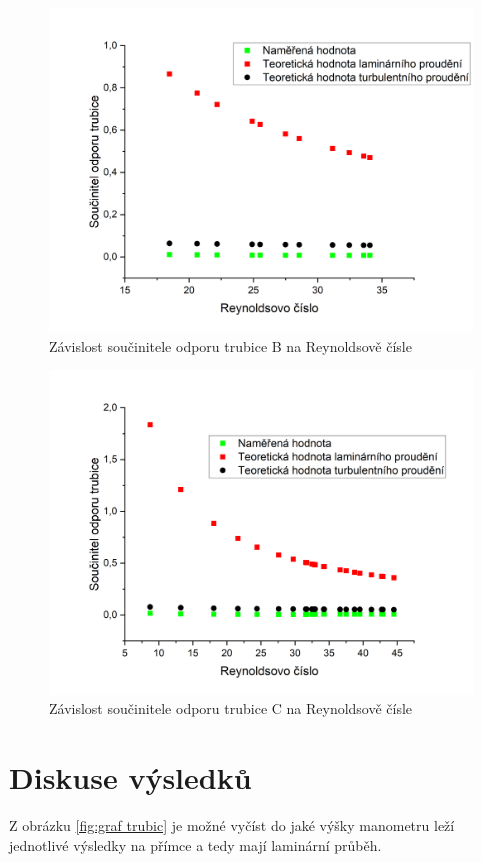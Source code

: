     \begin{figure}[h]
        \centering
        \includegraphics[width=0.6\linewidth]{01 - Studium proudění viskózní kapaliny trubicemi kruhového průřezu//Protokol//img/Re(k) B.png}
        \caption{Závislost součinitele odporu trubice B na Reynoldsově čísle}
        \label{fig:Re(k)) B}
    \end{figure}

    \begin{figure}[h]
        \centering
        \includegraphics[width=0.6\linewidth]{01 - Studium proudění viskózní kapaliny trubicemi kruhového průřezu//Protokol//img/Re(k) C.png}
        \caption{Závislost součinitele odporu trubice C na Reynoldsově čísle}
        \label{fig:Re(k) C}
    \end{figure}
\newpage
    
\section{Diskuse výsledků}

    Z obrázku \ref{fig:graf trubic} je možné vyčíst do jaké výšky manometru leží jednotlivé výsledky na přímce a tedy mají laminární průběh.

